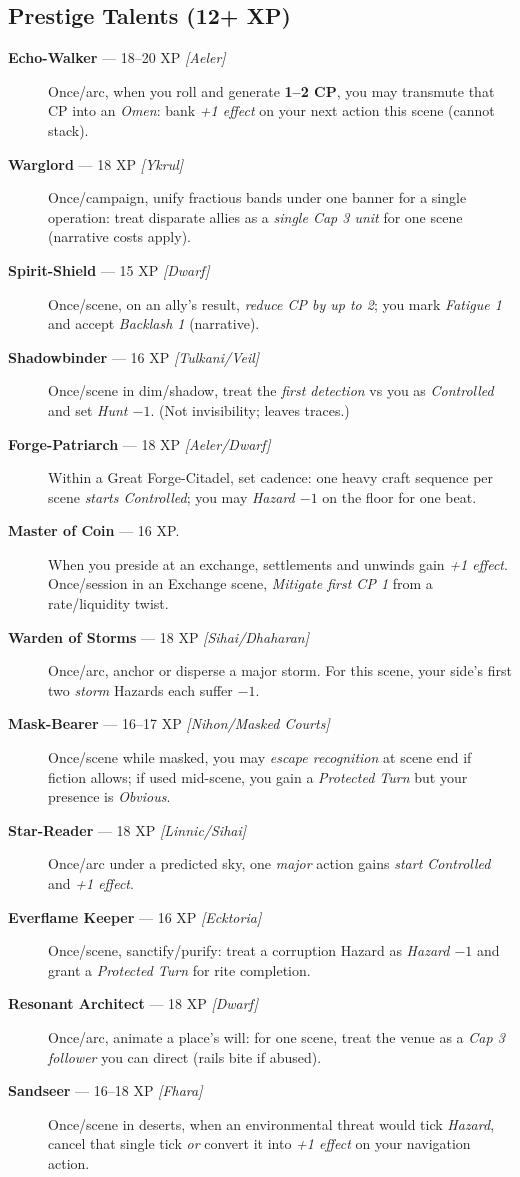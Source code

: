\documentclass[11pt]{article}
\begin{document}
\subsection*{Prestige Talents (12+ XP)}
\begin{description}
  \item[\textbf{Echo-Walker} — 18–20 XP \emph{[Aeler]}] Once/arc, when you roll and generate \textbf{1–2 CP}, you may transmute that CP into an \emph{Omen}: bank \emph{+1 effect} on your next action this scene (cannot stack).
  \item[\textbf{Warglord} — 18 XP \emph{[Ykrul]}] Once/campaign, unify fractious bands under one banner for a single operation: treat disparate allies as a \emph{single Cap 3 unit} for one scene (narrative costs apply).
  \item[\textbf{Spirit-Shield} — 15 XP \emph{[Dwarf]}] Once/scene, on an ally’s result, \emph{reduce CP by up to 2}; you mark \emph{Fatigue 1} and accept \emph{Backlash 1} (narrative).
  \item[\textbf{Shadowbinder} — 16 XP \emph{[Tulkani/Veil]}] Once/scene in dim/shadow, treat the \emph{first detection} vs you as \emph{Controlled} and set \emph{Hunt $-1$}. (Not invisibility; leaves traces.)
  \item[\textbf{Forge-Patriarch} — 18 XP \emph{[Aeler/Dwarf]}] Within a Great Forge-Citadel, set cadence: one heavy craft sequence per scene \emph{starts Controlled}; you may \emph{Hazard $-1$} on the floor for one beat.
  \item[\textbf{Master of Coin} — 16 XP.] When you preside at an exchange, settlements and unwinds gain \emph{+1 effect}. Once/session in an Exchange scene, \emph{Mitigate first CP 1} from a rate/liquidity twist.
  \item[\textbf{Warden of Storms} — 18 XP \emph{[Sihai/Dhaharan]}] Once/arc, anchor or disperse a major storm. For this scene, your side’s first two \emph{storm} Hazards each suffer \emph{$-1$}.
  \item[\textbf{Mask-Bearer} — 16–17 XP \emph{[Nihon/Masked Courts]}] Once/scene while masked, you may \emph{escape recognition} at scene end if fiction allows; if used mid-scene, you gain a \emph{Protected Turn} but your presence is \emph{Obvious}.
  \item[\textbf{Star-Reader} — 18 XP \emph{[Linnic/Sihai]}] Once/arc under a predicted sky, one \emph{major} action gains \emph{start Controlled} and \emph{+1 effect}.
  \item[\textbf{Everflame Keeper} — 16 XP \emph{[Ecktoria]}] Once/scene, sanctify/purify: treat a corruption Hazard as \emph{Hazard $-1$} and grant a \emph{Protected Turn} for rite completion.
  \item[\textbf{Resonant Architect} — 18 XP \emph{[Dwarf]}] Once/arc, animate a place’s will: for one scene, treat the venue as a \emph{Cap 3 follower} you can direct (rails bite if abused).
  \item[\textbf{Sandseer} — 16–18 XP \emph{[Fhara]}] Once/scene in deserts, when an environmental threat would tick \emph{Hazard}, cancel that single tick \emph{or} convert it into \emph{+1 effect} on your navigation action.
\end{description}
\end{document}
